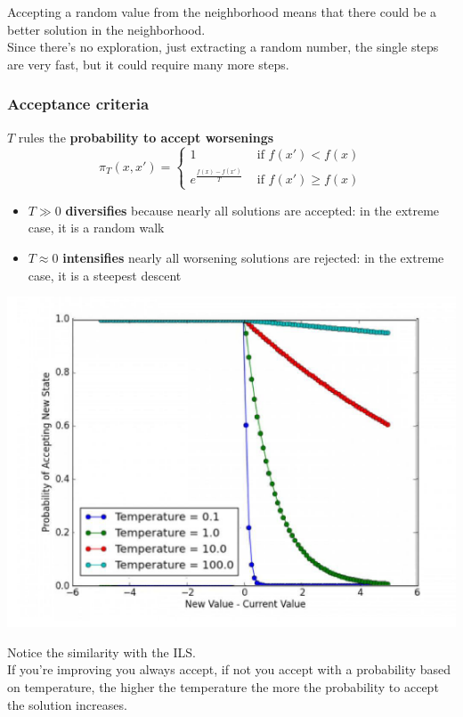 Accepting a random value from the neighborhood means that there could be a better solution in the neighborhood.\\
Since there's no exploration, just extracting a random number, the single steps are very fast, but it could require many more steps.

\newpage

\subsubsection{Acceptance criteria}
$T$ rules the \textbf{probability to accept worsenings}
$$ \pi_T (x, x') = \begin{cases}
	1 & \text{ if } f(x') < f(x) \\
	e^{\frac{f(x) - f(x')}{T}} & \text{ if } f(x') \geq f(x)
\end{cases}$$

\begin{itemize}
	\item $T \gg 0$ \textbf{diversifies} because nearly all solutions are accepted: in the extreme case, it is a random walk
	
	\item $T \approx 0$ \textbf{intensifies} nearly all worsening solutions are rejected: in the extreme case, it is a steepest descent
	
\end{itemize}

\begin{center}
	\includegraphics[width=0.6\columnwidth]{img/temp1}
\end{center}

Notice the similarity with the ILS.\\

If you're improving you always accept, if not you accept with a probability based on temperature, the higher the temperature the more the probability to accept the solution increases.\\

